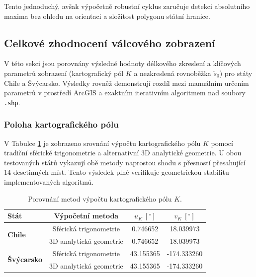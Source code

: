 \documentclass[12pt, a4paper]{article}
\begin{document}
\vspace{1.5em}

Tento jednoduchý, avšak výpočetně robustní cyklus zaručuje detekci absolutního maxima bez ohledu na orientaci a složitost polygonu státní hranice.

\subsection{Celkové zhodnocení válcového zobrazení}

V této sekci jsou porovnány výsledné hodnoty délkového zkreslení a klíčových parametrů zobrazení (kartografický pól $K$ a nezkreslená rovnoběžka $\check{s}_0$) pro státy Chile a Švýcarsko. Výsledky rovněž demonstrují rozdíl mezi manuálním určením parametrů v prostředí ArcGIS a exaktním iterativním algoritmem nad soubory \texttt{.shp}.

\subsubsection{Poloha kartografického pólu}

V Tabulce \ref{tab:pol_k_porovnani} je zobrazeno srovnání výpočtu kartografického pólu $K$ pomocí tradiční sférické trigonometrie a alternativní 3D analytické geometrie. U obou testovaných států vykazují obě metody naprostou shodu s přesností přesahující 14 desetinných míst. Tento výsledek plně verifikuje geometrickou stabilitu implementovaných algoritmů.

\begin{table}[htbp]
    \centering
    \renewcommand{\arraystretch}{1.2}
    \begin{tabular}{|l|c|c|c|}
        \hline
        \textbf{Stát} & \textbf{Výpočetní metoda} & \textbf{$u_K \ [^\circ]$} & \textbf{$v_K \ [^\circ]$} \\
        \hline
        \multirow{2}{*}{\textbf{Chile}} & Sférická trigonometrie & 0.746652 & 18.039973 \\
        & 3D analytická geometrie & 0.746652 & 18.039973 \\
        \hline
        \multirow{2}{*}{\textbf{Švýcarsko}} & Sférická trigonometrie & 43.155365 & -174.333260 \\
        & 3D analytická geometrie & 43.155365 & -174.333260 \\
        \hline
    \end{tabular}
    \caption{Porovnání metod výpočtu kartografického pólu $K$.}
    \label{tab:pol_k_porovnani}
\end{table}
\end{document}
